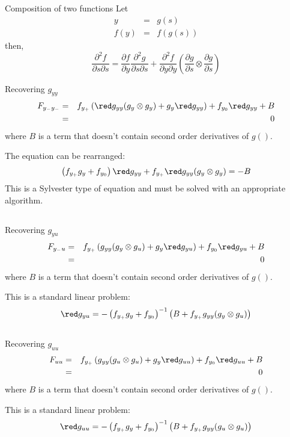 \documentclass{beamer}
\begin{document}
\subsection[]{}
\begin{slide}{Composition of two functions}
Let
  \begin{eqnarray*}
    y &=& g(s)\\
    f(y)&=& f(g(s))
  \end{eqnarray*}
then,
\[
\frac{\partial^2 f}{\partial s\partial s}=\frac{\partial f}{\partial y}\frac{\partial^2 g}{\partial s\partial s}+\frac{\partial^2 f}{\partial y\partial y}\left(\frac{\partial g}{\partial s}\otimes\frac{\partial g}{\partial s}\right)
\]
\end{slide}


\begin{slide}{Recovering $g_{yy}$}
  \begin{eqnarray*}
    F_{y_-y_-} &=& f_{y_+}\left({\red g_{yy}}(g_y\otimes g_y)+g_y{\red g_{yy}}\right)+f_{y_0}{\red g_{yy}}+B\\
&=&0 
  \end{eqnarray*}
where $B$ is a term that doesn't contain second order derivatives of $g()$.

The equation can be rearranged:
\[
\left(f_{y_+}g_y+f_{y_0}\right){\red g_{yy}}+f_{y_+}{\red g_{yy}}(g_y\otimes g_y)=-B
\]
This is a Sylvester type of equation and must be solved with an appropriate algorithm.
\end{slide}

\subsection[]{}
\begin{slide}{Recovering $g_{yu}$}
  \begin{eqnarray*}
    F_{y_-u} &=& f_{y_+}\left(g_{yy}(g_y\otimes g_u)+g_y{\red g_{yu}}\right)+f_{y_0}{\red g_{yu}}+B\\
&=&0 
  \end{eqnarray*}
where $B$ is a term that doesn't contain second order derivatives of $g()$.

This is a standard linear problem:
\[
{\red g_{yu}}=-\left(f_{y_+}g_y+f_{y_0}\right)^{-1}\left(B+f_{y_+}g_{yy}(g_y\otimes g_u)\right)
\]
\end{slide}


\subsection[]{}
\begin{slide}{Recovering $g_{uu}$}
  \begin{eqnarray*}
    F_{uu} &=& f_{y_+}\left(g_{yy}(g_u\otimes g_u)+g_y{\red g_{uu}}\right)+f_{y_0}{\red g_{uu}}+B\\
&=&0 
  \end{eqnarray*}
where $B$ is a term that doesn't contain second order derivatives of $g()$.

This is a standard linear problem:
\[
{\red g_{uu}}=-\left(f_{y_+}g_y+f_{y_0}\right)^{-1}\left(B+f_{y_+}g_{yy}(g_u\otimes g_u)\right)
\]
\end{slide}
\end{document}
